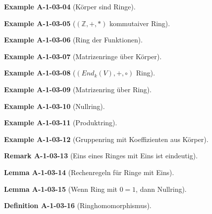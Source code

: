 \documentclass[10pt, letterpaper]{article}
\newcommand{\Z}{\mathbb{Z}}
\newcommand{\CustomHeading}[3]{%
  \par\medskip\noindent%
  \textbf{#1 #2} \textnormal{(#3)}.\enskip%
}
\newenvironment{DEF}[2]{\CustomHeading{Definition}{#1}{#2}}{}
\newenvironment{LEM}[2]{\CustomHeading{Lemma}{#1}{#2}}{}
\newenvironment{REM}[2]{\CustomHeading{Remark}{#1}{#2}}{}
\newenvironment{EXA}[2]{\CustomHeading{Example}{#1}{#2}}{}
\begin{document}
\begin{EXA}{A-1-03-04}{Körper sind Ringe}
\end{EXA}

\begin{EXA}{A-1-03-05}{$(\Z,+,*)$ kommutaiver Ring}
\end{EXA}

\begin{EXA}{A-1-03-06}{Ring der Funktionen}
\end{EXA}

\begin{EXA}{A-1-03-07}{Matrizenringe über Körper}
\end{EXA}

\begin{EXA}{A-1-03-08}{$(End_k(V),+,\circ)$ Ring}
\end{EXA}

\begin{EXA}{A-1-03-09}{Matrizenring über Ring}
\end{EXA}

\begin{EXA}{A-1-03-10}{Nullring}
\end{EXA}

\begin{EXA}{A-1-03-11}{Produktring}
\end{EXA}

\begin{EXA}{A-1-03-12}{Gruppenring mit Koeffizienten aus Körper}
\end{EXA}

\begin{REM}{A-1-03-13}{Eins eines Ringes mit Eins ist eindeutig}
\end{REM}

\begin{LEM}{A-1-03-14}{Rechenregeln für Ringe mit Eins}
\end{LEM}

\begin{LEM}{A-1-03-15}{Wenn Ring mit $0=1$, dann Nullring}
\end{LEM}

\begin{DEF}{A-1-03-16}{Ringhomomorphismus}
\end{DEF}
\end{document}
